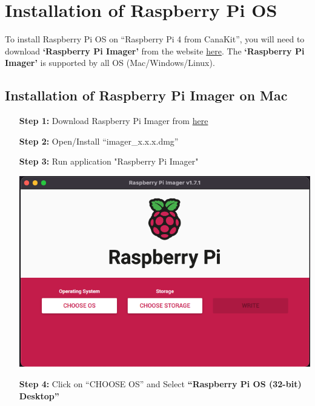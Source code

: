 \section{Installation of Raspberry Pi OS}	\label{sec:run-raspberry}
	To install Raspberry Pi OS on ``Raspberry Pi 4 from CanaKit'', you will need to download \textbf{`Raspberry Pi Imager'} from the website \href{https://www.raspberrypi.com/software/}{here}. The \textbf{`Raspberry Pi Imager'} is supported by all OS (Mac/Windows/Linux). 
	
	\subsection{Installation of Raspberry Pi Imager on Mac}
		\begin{itemize}[leftmargin=1.7cm]
			\item[\textbf{Step 1:}] Download Raspberry Pi Imager from \href{https://downloads.raspberrypi.org/imager/imager_latest.dmg}{here}
			\item[\textbf{Step 2:}] Open/Install ``imager\_x.x.x.dmg''
			\item[\textbf{Step 3:}] Run application "Raspberry Pi Imager"\\
				\begin{minipage}{\textwidth}
					\vspace{2mm}
					\includegraphics[scale=0.35]{Images/raspberry_pi/app.png}
					\vspace{2mm}
				\end{minipage}
			\item[\textbf{Step 4:}] Click on ``CHOOSE OS'' and Select \textbf{``Raspberry Pi OS (32-bit) Desktop''}\\
				\begin{minipage}{\textwidth}

\end{minipage}
\end{itemize}
